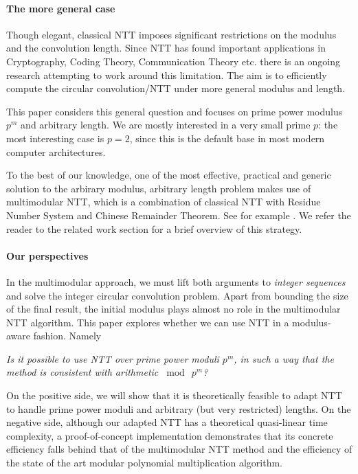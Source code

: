 \paragraph{The more general case}
Though elegant, classical NTT imposes significant restrictions on the modulus and the convolution length. Since NTT has found important applications in Cryptography, Coding Theory, Communication Theory etc. there is an ongoing research attempting to work around this limitation. The aim is to efficiently compute the circular convolution/NTT under more general modulus and length.

This paper considers this general question and focuses on prime power modulus \(p^m\) and arbitrary length. We are mostly interested in a very small prime \(p\): the most interesting case is \(p = 2\), since this is the default base in most modern computer architectures.

To the best of our knowledge, one of the most effective, practical and generic solution to the arbirary modulus, arbitrary length problem makes use of multimodular NTT, which is a combination of classical NTT with Residue Number System and Chinese Remainder Theorem. See for example \cite[Sect~6]{JSC:Shoup95}. We refer the reader to the related work section for a brief overview of this strategy.

\paragraph{Our perspectives}
In the multimodular approach, we must lift both arguments to \emph{integer sequences} and solve the integer circular convolution problem. Apart from bounding the size of the final result, the initial modulus plays almost no role in the multimodular NTT algorithm. This paper explores whether we can use NTT in a modulus-aware fashion. Namely

\begin{center}
    \it
    Is it possible to use NTT over prime power moduli \(p^m\), in such a way that the method is consistent with arithmetic \(\bmod \  p^m\)?
\end{center}

On the positive side, we will show that it is theoretically feasible to adapt NTT to handle prime power moduli and arbitrary (but very restricted) lengths. On the negative side, although our adapted NTT has a theoretical quasi-linear time complexity, a proof-of-concept implementation demonstrates that its concrete efficiency falls behind that of the multimodular NTT method and the efficiency of the state of the art modular polynomial multiplication algorithm. 


